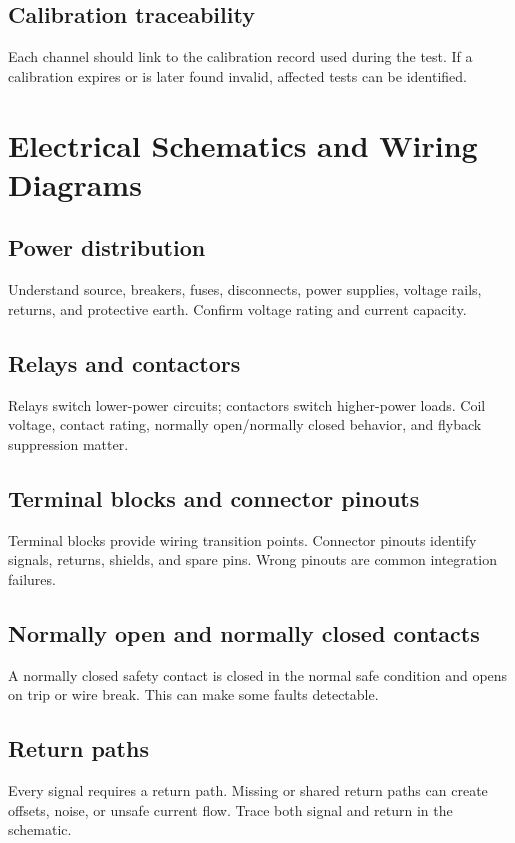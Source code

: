 \documentclass[11pt]{article}
\begin{document}
\subsection{Calibration traceability}
Each channel should link to the calibration record used during the test. If a
calibration expires or is later found invalid, affected tests can be identified.

\section{Electrical Schematics and Wiring Diagrams}

\subsection{Power distribution}
Understand source, breakers, fuses, disconnects, power supplies, voltage rails,
returns, and protective earth. Confirm voltage rating and current capacity.

\subsection{Relays and contactors}
Relays switch lower-power circuits; contactors switch higher-power loads.
Coil voltage, contact rating, normally open/normally closed behavior, and
flyback suppression matter.

\subsection{Terminal blocks and connector pinouts}
Terminal blocks provide wiring transition points. Connector pinouts identify
signals, returns, shields, and spare pins. Wrong pinouts are common integration
failures.

\subsection{Normally open and normally closed contacts}
A normally closed safety contact is closed in the normal safe condition and opens
on trip or wire break. This can make some faults detectable.

\subsection{Return paths}
Every signal requires a return path. Missing or shared return paths can create
offsets, noise, or unsafe current flow. Trace both signal and return in the
schematic.
\end{document}

